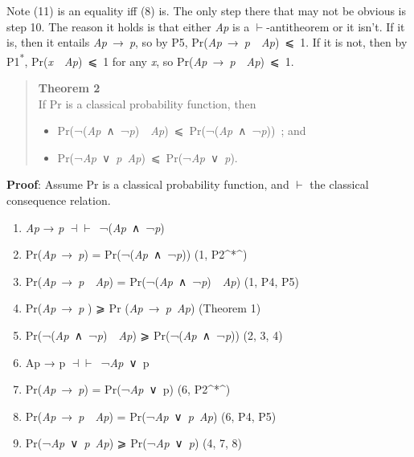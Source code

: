 \documentclass[
  11pt,
  letterpaper,
  DIV=11,
  numbers=noendperiod,
  twoside]{scrartcl}
\providecommand{\tightlist}{%
  \setlength{\itemsep}{0pt}\setlength{\parskip}{0pt}}
\begin{document}
Note (11) is an equality iff (8) is. The only step there that may not be
obvious is step 10. The reason it holds is that either \emph{Ap} is a
\(\vdash\)-antitheorem or it isn't. If it is, then it entails
\emph{Ap}~→~\emph{p}, so by P5,
Pr(\emph{Ap}~→~\emph{p}~\textbar~\emph{Ap})~⩽~1. If it is not, then by
P1\textsuperscript{*}, Pr(\emph{x}~\textbar~\emph{Ap})~⩽~1 for any
\emph{x}, so Pr(\emph{Ap}~→~\emph{p}~\textbar~\emph{Ap})~⩽~1.

\begin{quote}
\textbf{Theorem 2}\\
If Pr is a classical probability function, then

\begin{itemize}
\tightlist
\item
  Pr(¬(\emph{Ap}~∧~¬\emph{p})~\textbar~\emph{Ap})~⩽~Pr(¬(\emph{Ap}~∧~¬\emph{p}))~;
  and
\item
  Pr(¬\emph{Ap}~∨~\emph{p}\textbar~\emph{Ap})~⩽~Pr(¬\emph{Ap}~∨~\emph{p}).
\end{itemize}
\end{quote}

\textbf{Proof}: Assume Pr is a classical probability function, and
\(\vdash\) the classical consequence relation.

\begin{enumerate}
\def\labelenumi{\arabic{enumi}.}
\tightlist
\item
  \emph{Ap} → \emph{p} \(\dashv \vdash\)~¬(\emph{Ap}~∧~¬\emph{p})
\item
  Pr(\emph{Ap}~→~\emph{p}) = Pr(¬(\emph{Ap}~∧~¬\emph{p})) (1,
  P2\^{}*\^{})
\item
  Pr(\emph{Ap}~→~\emph{p}~\textbar~\emph{Ap}) =
  Pr(¬(\emph{Ap}~∧~¬\emph{p})~\textbar~\emph{Ap}) (1, P4, P5)
\item
  Pr(\emph{Ap}~→~\emph{p} ) ⩾ Pr
  (\emph{Ap}~→~\emph{p}\textbar~\emph{Ap}) (Theorem 1)
\item
  Pr(¬(\emph{Ap}~∧~¬\emph{p})~\textbar~\emph{Ap}) ⩾
  Pr(¬(\emph{Ap}~∧~¬\emph{p})) (2, 3, 4)
\item
  Ap → p \(\dashv \vdash\)~¬\emph{Ap}~∨~p
\item
  Pr(\emph{Ap}~→~\emph{p}) = Pr(¬\emph{Ap}~∨~p) (6, P2\^{}*\^{})
\item
  Pr(\emph{Ap}~→~\emph{p}~\textbar~\emph{Ap}) =
  Pr(¬\emph{Ap}~∨~\emph{p}\textbar~\emph{Ap}) (6, P4, P5)
\item
  Pr(¬\emph{Ap}~∨~\emph{p}\textbar~\emph{Ap}) ⩾
  Pr(¬\emph{Ap}~∨~\emph{p}) (4, 7, 8)
\end{enumerate}
\end{document}
